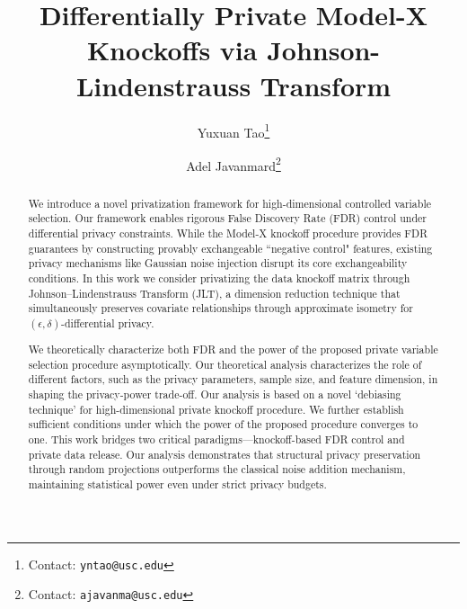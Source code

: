 \documentclass[11pt]{article}
\begin{document}

\title{Differentially Private Model-X Knockoffs via Johnson-Lindenstrauss Transform}

\author[1]{Yuxuan Tao\thanks{Contact: \texttt{yntao@usc.edu}}}
\author[2]{Adel Javanmard\thanks{Contact: \texttt{ajavanma@usc.edu}}}


\maketitle

\begin{abstract}

We introduce a novel privatization framework for high-dimensional controlled variable selection. Our framework enables rigorous False Discovery Rate (FDR) control under differential privacy constraints. While the Model-X knockoff procedure provides FDR guarantees by constructing provably exchangeable ``negative control" features, existing privacy mechanisms like Gaussian noise injection disrupt its core exchangeability conditions. In this work we consider privatizing the data knockoff matrix through Johnson--Lindenstrauss Transform (JLT), a dimension reduction technique that simultaneously preserves covariate relationships through approximate isometry for $(\epsilon,\delta)$-differential privacy.

We theoretically characterize both FDR and the power of the proposed private variable selection procedure asymptotically. Our theoretical analysis characterizes the role of different factors, such as the privacy parameters, sample size, and feature dimension, in shaping the privacy-power trade-off. Our analysis is based on a novel `debiasing technique' for high-dimensional private knockoff procedure.
We further establish sufficient conditions under which the power of the proposed procedure converges to one. This work bridges two critical paradigms---knockoff-based FDR control and private data release. Our analysis demonstrates that structural privacy preservation through random projections outperforms the classical noise addition mechanism, maintaining statistical power even under strict privacy budgets.
\end{abstract}
\end{document}
